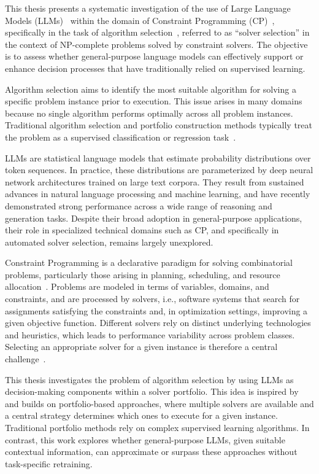 \documentclass[../../main]{subfiles}
\begin{document}
This thesis presents a systematic investigation of the use of Large Language Models (LLMs)~\cite{LLMsIBM} within the domain of Constraint Programming (CP)~\cite{CPholygrail}, specifically in the task of algorithm selection~\cite{AlgSelProb}, referred to as ``solver selection'' in the context of NP-complete problems solved by constraint solvers. The objective is to assess whether general-purpose language models can effectively support or enhance decision processes that have traditionally relied on supervised learning.

Algorithm selection aims to identify the most suitable algorithm for solving a specific problem instance prior to execution. This issue arises in many domains because no single algorithm performs optimally across all problem instances. Traditional algorithm selection and portfolio construction methods typically treat the problem as a supervised classification or regression task~\cite{algSelRanking}.

LLMs are statistical language models that estimate probability distributions over token sequences. In practice, these distributions are parameterized by deep neural network architectures trained on large text corpora. They result from sustained advances in natural language processing and machine learning, and have recently demonstrated strong performance across a wide range of reasoning and generation tasks. Despite their broad adoption in general-purpose applications, their role in specialized technical domains such as CP, and specifically in automated solver selection, remains largely unexplored.

Constraint Programming is a declarative paradigm for solving combinatorial problems, particularly those arising in planning, scheduling, and resource allocation~\cite{CPholygrail}. Problems are modeled in terms of variables, domains, and constraints, and are processed by solvers, i.e., software systems that search for assignments satisfying the constraints and, in optimization settings, improving a given objective function. Different solvers rely on distinct underlying technologies and heuristics, which leads to performance variability across problem classes. Selecting an appropriate solver for a given instance is therefore a central challenge~\cite{evaluationMetaSolvers}.

This thesis investigates the problem of algorithm selection by using LLMs as decision-making components within a solver portfolio. This idea is inspired by~\cite{fromPFStoAS} and builds on portfolio-based approaches, where multiple solvers are available and a central strategy determines which ones to execute for a given instance. Traditional portfolio methods rely on complex supervised learning algorithms. In contrast, this work explores whether general-purpose LLMs, given suitable contextual information, can approximate or surpass these approaches without task-specific retraining.
\end{document}
